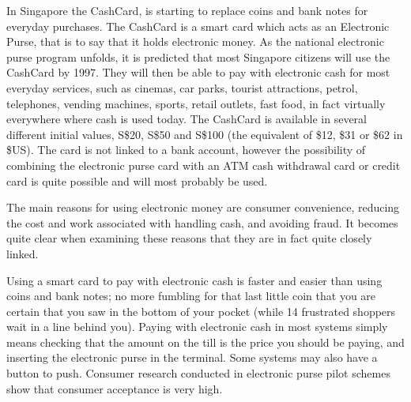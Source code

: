 \begin{htmllist}

    
    In Singapore the CashCard, is starting to replace coins and bank notes
    for everyday purchases. The CashCard is a smart card which acts as an
    Electronic Purse, that is to say that it holds electronic money. As the
    national electronic purse program unfolds, it is predicted that most
    Singapore citizens will use the CashCard by 1997. They will then be
    able to pay with electronic cash for most everyday services, such as
    cinemas, car parks, tourist attractions, petrol, telephones, vending
    machines, sports, retail outlets, fast food, in fact virtually
    everywhere where cash is used today. The CashCard is available in
    several different initial values, S\$20, S\$50 and S\$100 (the
    equivalent of \$12, \$31 or \$62 in \$US). The card is not linked to a
    bank account, however the possibility of combining the electronic purse
    card with an ATM cash withdrawal card or credit card is quite possible
    and will most probably be used.\\

    
    The main reasons for using electronic money are consumer convenience,
    reducing the cost and work associated with handling cash, and avoiding
    fraud. It becomes quite clear when examining these reasons that they
    are in fact quite closely linked.\\

    
    Using a smart card to pay with electronic cash is faster and easier
    than using coins and bank notes; no more fumbling for that last little
    coin that you are certain that you saw in the bottom of your pocket
    (while 14 frustrated shoppers wait in a line behind you). Paying with
    electronic cash in most systems simply means checking that the amount
    on the till is the price you should be paying, and inserting the
    electronic purse in the terminal. Some systems may also have a button
    to push. Consumer research conducted in electronic purse pilot schemes
    show that consumer acceptance is very high.\\


\end{htmllist}
